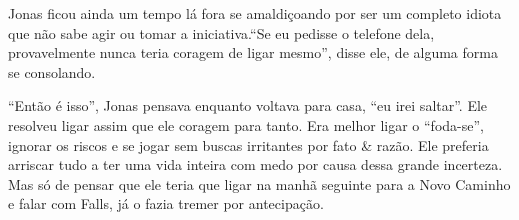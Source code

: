 Jonas ficou ainda um tempo lá fora se amaldiçoando por ser um completo idiota que não sabe agir ou tomar a iniciativa.``Se eu pedisse o telefone dela, provavelmente nunca teria coragem de ligar mesmo'', disse ele, de alguma forma se consolando.

``Então é isso'', Jonas pensava\mudanca{,} enquanto voltava para casa, ``eu irei saltar''. Ele resolveu ligar assim que ele  coragem para tanto. Era melhor ligar o ``foda-se'', ignorar os riscos e se jogar sem buscas irritantes por fato \& razão. Ele preferia arriscar tudo a ter uma vida inteira com medo por causa dessa grande incerteza. Mas só de pensar que ele teria que ligar na manhã seguinte para a Novo Caminho e falar com Falls, já o fazia tremer por antecipação.
